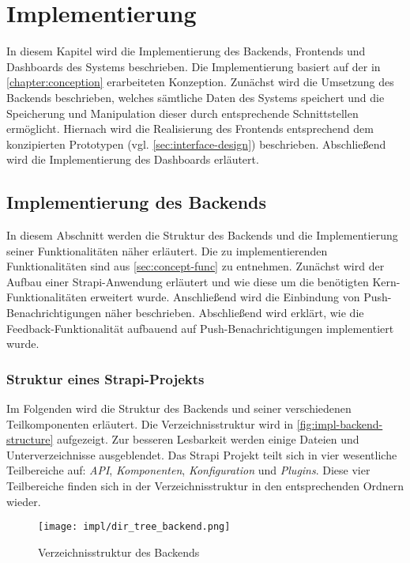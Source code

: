 \chapter{Implementierung} \label{chapter:implementation}

In diesem Kapitel wird die Implementierung des Backends, Frontends und
Dashboards des Systems beschrieben. Die Implementierung basiert auf der in
\autoref{chapter:conception} erarbeiteten Konzeption.  Zunächst wird die
Umsetzung des Backends beschrieben, welches sämtliche Daten des Systems
speichert und die Speicherung und Manipulation dieser durch entsprechende
Schnittstellen ermöglicht. Hiernach wird die Realisierung des Frontends
entsprechend dem konzipierten Prototypen (vgl. \autoref{sec:interface-design})
beschrieben. Abschließend wird die Implementierung des Dashboards erläutert.

\section{Implementierung des Backends}

In diesem Abschnitt werden die Struktur des Backends und die Implementierung
seiner Funktionalitäten näher erläutert. Die zu implementierenden
Funktionalitäten sind aus \autoref{sec:concept-func} zu entnehmen. Zunächst wird
der Aufbau einer Strapi-Anwendung erläutert und wie diese um die benötigten
Kern-Funktionalitäten erweitert wurde. Anschließend wird die Einbindung von
Push-Benachrichtigungen näher beschrieben. Abschließend wird erklärt, wie die
Feedback-Funktionalität aufbauend auf Push-Benachrichtigungen implementiert
wurde.

\subsection{Struktur eines Strapi-Projekts} \label{ssec:impl-backend-structure}

Im Folgenden wird die Struktur des Backends und seiner verschiedenen
Teilkomponenten erläutert. Die Verzeichnisstruktur wird in
\autoref{fig:impl-backend-structure} aufgezeigt. Zur besseren Lesbarkeit werden
einige Dateien und Unterverzeichnisse ausgeblendet. Das Strapi Projekt teilt
sich in vier wesentliche Teilbereiche auf: \textit{API}, \textit{Komponenten},
\textit{Konfiguration} und \textit{Plugins}. Diese vier Teilbereiche finden sich
in der Verzeichnisstruktur in den entsprechenden Ordnern wieder.

\begin{figure}[htpb]
    \centering
    \texttt{[image: impl/dir\_tree\_backend.png]}
    \caption{Verzeichnisstruktur des Backends}
    \label{fig:impl-backend-structure}
\end{figure}

